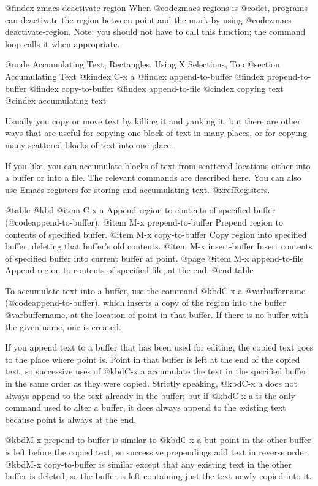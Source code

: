 {{{{@findex zmacs-deactivate-region
When @code{zmacs-regions} is @code{t}, programs can deactivate the region
between point and the mark by using @code{zmacs-deactivate-region}.
Note: you should not have to call this function; the command loop calls
it when appropriate. 

@node Accumulating Text, Rectangles, Using X Selections, Top
@section Accumulating Text
@kindex C-x a
@findex append-to-buffer
@findex prepend-to-buffer
@findex copy-to-buffer
@findex append-to-file
@cindex copying text
@cindex accumulating text

  Usually you copy or move text by killing it and yanking it, but there are
other ways that are useful for copying one block of text in many places, or
for copying many scattered blocks of text into one place.

  If you like, you can accumulate blocks of text from scattered
locations either into a buffer or into a file.  The relevant commands
are described here.  You can also use Emacs registers for storing and
accumulating text.  @xref{Registers}.

@table @kbd
@item C-x a
Append region to contents of specified buffer (@code{append-to-buffer}).
@item M-x prepend-to-buffer
Prepend region to contents of specified buffer.
@item M-x copy-to-buffer
Copy region into specified buffer, deleting that buffer's old contents.
@item M-x insert-buffer
Insert contents of specified buffer into current buffer at point.
@page
@item M-x append-to-file
Append region to contents of specified file, at the end.
@end table

  To accumulate text into a buffer, use the command @kbd{C-x a
@var{buffername}} (@code{append-to-buffer}), which inserts a copy of the
region into the buffer @var{buffername}, at the location of point in
that buffer.  If there is no buffer with the given name, one is created.

  If you append text to a buffer that has been used for editing, the
copied text goes to the place where point is.  Point in that buffer is
left at the end of the copied text, so successive uses of @kbd{C-x a}
accumulate the text in the specified buffer in the same order as they
were copied.  Strictly speaking, @kbd{C-x a} does not always append to
the text already in the buffer; but if @kbd{C-x a} is the only command
used to alter a buffer, it does always append to the existing text
because point is always at the end.

  @kbd{M-x prepend-to-buffer} is similar to @kbd{C-x a} but point in
the other buffer is left before the copied text, so successive prependings
add text in reverse order.  @kbd{M-x copy-to-buffer} is similar except that
any existing text in the other buffer is deleted, so the buffer is left
containing just the text newly copied into it.

}}}}
